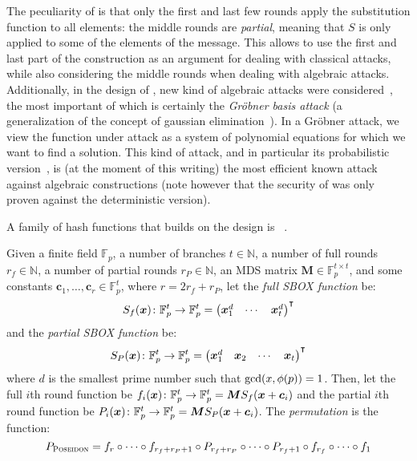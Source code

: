 The peculiarity of \Hades{} is that only the first and last few rounds apply the substitution
function to all elements: the middle rounds are \emph{partial}, meaning that \(S\) is only applied 
to some of the elements of the message.
This allows to use the first and last part of the construction as an argument for dealing with 
classical attacks, while also considering the middle rounds when dealing with algebraic attacks.
Additionally, in the design of \Hades{}, new kind of algebraic attacks were 
considered~\cite{BeyneEtAl2020}, the most important of which is certainly the 
\emph{Gr\"{o}bner basis attack} 
(a generalization of the concept of gaussian elimination~\cite{CoxLO2015,Lazard1983}).
In a Gr\"{o}bner attack, we view the function under attack as a system of polynomial equations 
for which we want to find a solution.
This kind of attack, and in particular its probabilistic version~\cite{FaugereGHR2014}, is 
(at the moment of this writing) the most efficient known attack against algebraic constructions 
(note however that the security of \Hades{} was only proven against the deterministic 
version).

A family of hash functions that builds on the \Hades{} design is \Poseidon~\cite{GrassiKRRS2021}.
\begin{definition}
  Given a finite field \(\mathbb{F}_p\), a number of branches \(t \in \mathbb{N}\), a number of 
  full rounds \(r_f \in \mathbb{N}\), a number of partial rounds \(r_{P} \in \mathbb{N}\), 
  an MDS matrix \(\bm{M} \in \mathbb{F}_{p}^{t \times t}\), and some constants 
  \(\bm{c}_{1}, \dots, \bm{c}_{r} \in \mathbb{F}_{p}^{t}\), where \(r = 2r_f + r_P\), let the 
  \emph{full SBOX function} be:
  \[
    \call{S_{f}}{\bm{x}}\colon \mathbb{F}_{p}^{t} \to \mathbb{F}_{p}^{t} = 
    {\begin{pmatrix}
      \bm{x}_{1}^{d} & \cdots & \bm{x}_{t}^{d}
    \end{pmatrix}}^{\transpose}
  \]
  and the \emph{partial SBOX function} be:
  \[
    \call{S_{P}}{\bm{x}}\colon \mathbb{F}_{p}^{t} \to \mathbb{F}_{p}^{t} = 
    {\begin{pmatrix}
      \bm{x}_{1}^{d} & \bm{x}_{2} & \cdots & \bm{x}_{t}
    \end{pmatrix}}^{\transpose}
  \]
  where \(d\) is the smallest prime number such that \(\call{\gcd}{x, \call{\totient}{p}} = 1\).
  Then, let the full \(i\)th round function be 
  \(\call{f_{i}}{\bm{x}}\colon \mathbb{F}_{p}^{t} \to \mathbb{F}_{p}^{t} = 
  \bm{M}\call{S_{f}}{\bm{x} + \bm{c}_{i}}\)
  and the partial \(i\)th round function be
  \(\call{P_{i}}{\bm{x}}\colon \mathbb{F}_{p}^{t} \to \mathbb{F}_{p}^{t} = 
  \bm{M}\call{S_{P}}{\bm{x} + \bm{c}_{i}}\).
  The \emph{\Poseidon{} permutation} is the function:
  \[
    P_{\textnormal{\textsc{Poseidon}}} = 
    f_{r} \circ \cdots \circ f_{r_f + r_P + 1} \circ 
    P_{r_f + r_P} \circ \cdots \circ P_{r_f + 1} \circ 
    f_{r_f} \circ \cdots \circ f_{1}
  \]
\end{definition}

